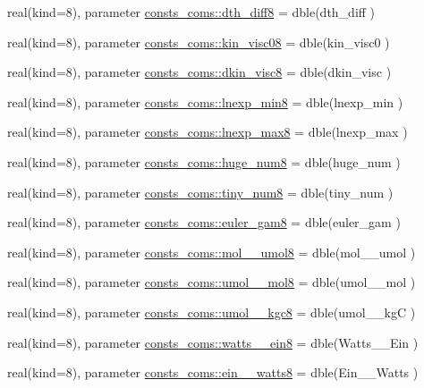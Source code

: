 \begin{DoxyCompactItemize}
\item 
real(kind=8), parameter \hyperlink{namespaceconsts__coms_a6984abec74717e326619006a024c3fd8}{consts\+\_\+coms\+::dth\+\_\+diff8} = dble(dth\+\_\+diff )
\item 
real(kind=8), parameter \hyperlink{namespaceconsts__coms_a412fde0c874abb8d51db37875fd0207d}{consts\+\_\+coms\+::kin\+\_\+visc08} = dble(kin\+\_\+visc0 )
\item 
real(kind=8), parameter \hyperlink{namespaceconsts__coms_a1b2932c7fcf0fd58caa884160e4fb2e8}{consts\+\_\+coms\+::dkin\+\_\+visc8} = dble(dkin\+\_\+visc )
\item 
real(kind=8), parameter \hyperlink{namespaceconsts__coms_a88b6625340c134995d6ce2ae8ad8f7b4}{consts\+\_\+coms\+::lnexp\+\_\+min8} = dble(lnexp\+\_\+min )
\item 
real(kind=8), parameter \hyperlink{namespaceconsts__coms_af97aceda250c3242870c60e2e5ad8f4c}{consts\+\_\+coms\+::lnexp\+\_\+max8} = dble(lnexp\+\_\+max )
\item 
real(kind=8), parameter \hyperlink{namespaceconsts__coms_ade7c97415ddfe86606e259317e709e8b}{consts\+\_\+coms\+::huge\+\_\+num8} = dble(huge\+\_\+num )
\item 
real(kind=8), parameter \hyperlink{namespaceconsts__coms_a573c8ad925cab4a7c537ec6e2b20a7a3}{consts\+\_\+coms\+::tiny\+\_\+num8} = dble(tiny\+\_\+num )
\item 
real(kind=8), parameter \hyperlink{namespaceconsts__coms_a61bc1f477f05d4493fec0947a2c52272}{consts\+\_\+coms\+::euler\+\_\+gam8} = dble(euler\+\_\+gam )
\item 
real(kind=8), parameter \hyperlink{namespaceconsts__coms_a667518325585dfb0f152a824bce1dcda}{consts\+\_\+coms\+::mol\+\_\+\_\+umol8} = dble(mol\+\_\+\_\+umol )
\item 
real(kind=8), parameter \hyperlink{namespaceconsts__coms_a1985bdf9dc2233ee0743d4c1f340d8ae}{consts\+\_\+coms\+::umol\+\_\+\_\+mol8} = dble(umol\+\_\+\_\+mol )
\item 
real(kind=8), parameter \hyperlink{namespaceconsts__coms_a066d6cf149acd92238cbe2e623fcdf1c}{consts\+\_\+coms\+::umol\+\_\+\_\+kgc8} = dble(umol\+\_\+\_\+kgC )
\item 
real(kind=8), parameter \hyperlink{namespaceconsts__coms_a58d5b3bd79a7637b140e4600eb27d5e9}{consts\+\_\+coms\+::watts\+\_\+\_\+ein8} = dble(Watts\+\_\+\_\+\+Ein )
\item 
real(kind=8), parameter \hyperlink{namespaceconsts__coms_ad0b693d469a9252c873f9c2589d2dda9}{consts\+\_\+coms\+::ein\+\_\+\_\+watts8} = dble(Ein\+\_\+\_\+\+Watts )
\end{DoxyCompactItemize}
